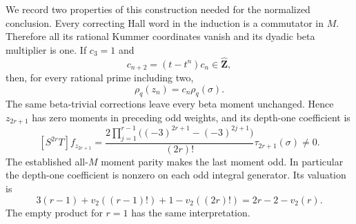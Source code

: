 We record two properties of this construction needed for the
normalized conclusion. Every correcting Hall word in the
induction is a commutator in $M$. Therefore all its rational
Kummer coordinates vanish and its dyadic beta multiplier is
one. If $c_3=1$ and
\[
 c_{n+2}=(t-t^n)c_n\in\widehat{\mathbf Z},
\]
then, for every rational prime including two,
\begin{equation}\label{eq:fr-uniform-kummer-collinearity}
 \rho_q(z_n)=c_n\rho_q(\sigma).
\end{equation}
The same beta-trivial corrections leave every beta moment
unchanged. Hence $z_{2r+1}$ has zero moments in preceding
odd weights, and its depth-one coefficient is
\begin{equation}\label{eq:fr-uniform-primitive-depth}
 [S^{2r}T]f_{z_{2r+1}}
 =\frac{2\prod_{j=1}^{r-1}
       \bigl((-3)^{2r+1}-(-3)^{2j+1}\bigr)}{(2r)!}
                         \tau_{2r+1}(\sigma)\ne0.
\end{equation}
The established all-$M$ moment parity makes the last moment
odd. In particular the depth-one coefficient is nonzero on
each odd integral generator. Its valuation is
\[
 3(r-1)+v_2((r-1)!)+1-v_2((2r)!)
                   =2r-2-v_2(r).
\]
The empty product for $r=1$ has the same interpretation.

